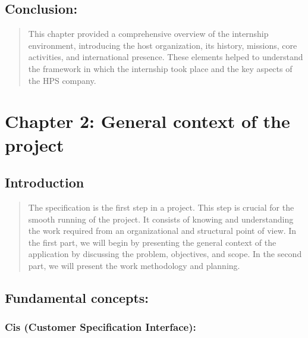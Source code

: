 \documentclass[12pt,a4paper]{report}
\begin{document}
\hypertarget{conclusion}{%
\subsection{\texorpdfstring{\textbf{Conclusion}:}{Conclusion:}}\label{conclusion}}

\begin{quote}
This chapter provided a comprehensive overview of the internship
environment, introducing the host organization, its history, missions,
core activities, and international presence. These elements helped to
understand the framework in which the internship took place and the key
aspects of the HPS company.
\end{quote}
\clearpage




\section{\texorpdfstring{\textbf{Chapter 2: General context of the
project}}{Chapter 2: General context of the project}}\label{chapter-2-general-context-of-the-project}
\subsection{\texorpdfstring{\textbf{Introduction}}{Introduction}}\label{introduction}

\begin{quote}
The specification is the first step in a project. This step is crucial
for the smooth running of the project. It consists of knowing and
understanding the work required from an organizational and structural
point of view. In the first part, we will begin by presenting the
general context of the application by discussing the problem,
objectives, and scope. In the second part, we will present the work
methodology and planning.
\end{quote}

\hypertarget{fundamental-concepts}{%
\subsection{\texorpdfstring{\textbf{Fundamental
concepts:}}{Fundamental concepts:}}\label{fundamental-concepts}}

\hypertarget{cis-customer-specification-interface}{%
\subsubsection{\texorpdfstring{\textbf{Cis (Customer Specification
Interface):}}{Cis (Customer Specification Interface):}}\label{cis-customer-specification-interface}}
\end{document}
